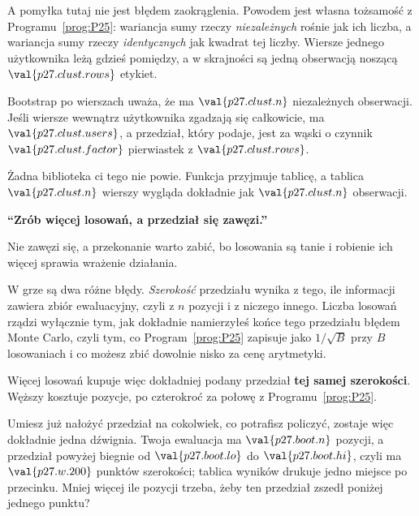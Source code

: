 \begin{fr}

A pomyłka tutaj nie jest błędem zaokrąglenia. Powodem jest własna tożsamość z
Programu~\ref{prog:P25}: wariancja sumy rzeczy \emph{niezależnych} rośnie jak
ich liczba, a wariancja sumy rzeczy \emph{identycznych} jak kwadrat tej
liczby. Wiersze jednego użytkownika leżą gdzieś pomiędzy, a w skrajności są
jedną obserwacją noszącą $\val{p27.clust.rows}$ etykiet.

Bootstrap po wierszach uważa, że ma $\val{p27.clust.n}$ niezależnych
obserwacji. Jeśli wiersze wewnątrz użytkownika zgadzają się całkowicie, ma
$\val{p27.clust.users}$, a przedział, który podaje, jest za wąski o czynnik
$\val{p27.clust.factor}$ \dash{} pierwiastek z $\val{p27.clust.rows}$.


Żadna biblioteka ci tego nie powie. Funkcja przyjmuje tablicę, a tablica
$\val{p27.clust.n}$ wierszy wygląda dokładnie jak $\val{p27.clust.n}$
obserwacji.
\end{fr}

\begin{fr}
\begin{trapbox}
\textbf{\enquote{Zrób więcej losowań, a przedział się zawęzi.}}

Nie zawęzi się, a przekonanie warto zabić, bo losowania są tanie i robienie
ich więcej sprawia wrażenie działania.

W grze są dwa różne błędy. \emph{Szerokość} przedziału wynika z tego, ile
informacji zawiera zbiór ewaluacyjny, czyli z $n$ pozycji i z niczego innego.
Liczba losowań rządzi wyłącznie tym, jak dokładnie namierzyłeś końce tego
przedziału \dash{} błędem Monte Carlo, czyli tym, co Program~\ref{prog:P25} zapisuje jako
$1/\sqrt{B}$ przy $B$ losowaniach i co możesz zbić dowolnie nisko za cenę
arytmetyki.

Więcej losowań kupuje więc dokładniej podany przedział \textbf{tej samej
szerokości}. Węższy kosztuje pozycje, po czterokroć za połowę z
Programu~\ref{prog:P25}.
\end{trapbox}

Umiesz już nałożyć przedział na cokolwiek, co potrafisz policzyć, zostaje
więc dokładnie jedna dźwignia. Twoja ewaluacja ma $\val{p27.boot.n}$ pozycji,
a przedział powyżej biegnie od $\val{p27.boot.lo}$ do $\val{p27.boot.hi}$,
czyli ma $\val{p27.w.200}$ punktów szerokości; tablica wyników drukuje jedno
miejsce po przecinku. Mniej więcej ile pozycji trzeba, żeby ten przedział
zszedł poniżej jednego punktu?
\dotline
\nextframe
\end{fr}

